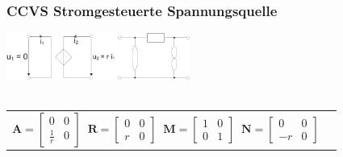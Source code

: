 \documentclass[a4paper,twocolumn,10pt]{article}
\begin{document}
\subsubsection*{CCVS Stromgesteuerte Spannungsquelle}
\includegraphics[width=0.45\textwidth]{Grafiken/OP_ISU}\\\\
\begin{tabular}{ll}
$\textbf{A}=\begin{bmatrix}0 & 0\\ \frac{1}{r} & 0\end{bmatrix}\;\;\textbf{R}=\begin{bmatrix}0 & 0\\ r & 0\end{bmatrix}\;\;\textbf{M}=\begin{bmatrix}1 & 0\\ 0 & 1\end{bmatrix}\;\;\textbf{N}=\begin{bmatrix}0 & 0\\ -r & 0\end{bmatrix}$
\end{tabular}
\end{document}
